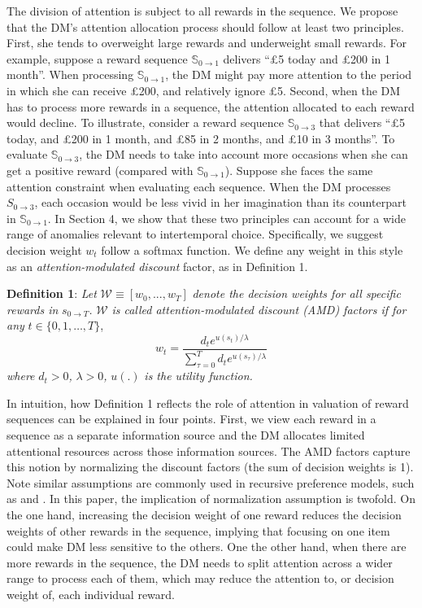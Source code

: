 \documentclass[
  12pt,
]{article}
\begin{document}
The division of attention is subject to all rewards in the sequence. We
propose that the DM's attention allocation process should follow at
least two principles. First, she tends to overweight large rewards and
underweight small rewards. For example, suppose a reward sequence
\(\mathbb{S}_{0\rightarrow1}\) delivers ``£5 today and £200 in 1
month''. When processing \(\mathbb{S}_{0\rightarrow1}\), the DM might
pay more attention to the period in which she can receive £200, and
relatively ignore £5. Second, when the DM has to process more rewards in
a sequence, the attention allocated to each reward would decline. To
illustrate, consider a reward sequence \(\mathbb{S}_{0\rightarrow 3}\)
that delivers ``£5 today, and £200 in 1 month, and £85 in 2 months, and
£10 in 3 months''. To evaluate \(\mathbb{S}_{0\rightarrow 3}\), the DM
needs to take into account more occasions when she can get a positive
reward (compared with \(\mathbb{S}_{0\rightarrow1}\)). Suppose she faces
the same attention constraint when evaluating each sequence. When the DM
processes \(S_{0\rightarrow 3}\), each occasion would be less vivid in
her imagination than its counterpart in \(\mathbb{S}_{0\rightarrow1}\).
In Section 4, we show that these two principles can account for a wide
range of anomalies relevant to intertemporal choice. Specifically, we
suggest decision weight \(w_t\) follow a softmax function. We define any
weight in this style as an \emph{attention-modulated discount} factor,
as in Definition 1.

\noindent \textbf{Definition 1}: \emph{Let}
\(\mathcal{W}\equiv[w_0,...,w_T]\) \emph{denote the decision weights for
all specific rewards in} \(s_{0\rightarrow T}\)\emph{.} \(\mathcal{W}\)
\emph{is called attention-modulated discount (AMD) factors if for any}
\(t\in\{0,1,…,T\}\),\[\tag{1}
w_t = \frac{d_te^{u(s_t)/\lambda}}{\sum_{\tau=0}^T d_te^{u(s_\tau)/\lambda}}
\]\emph{where} \(d_t > 0\)\emph{,} \(\lambda>0\)\emph{,} \(u(.)\)
\emph{is the utility function.}

In intuition, how Definition 1 reflects the role of attention in
valuation of reward sequences can be explained in four points. First, we
view each reward in a sequence as a separate information source and the
DM allocates limited attentional resources across those information
sources. The AMD factors capture this notion by normalizing the discount
factors (the sum of decision weights is 1). Note similar assumptions are
commonly used in recursive preference models, such as
\citet{weil1990nonexpected} and \citet{epstein1991substitution} . In
this paper, the implication of normalization assumption is twofold. On
the one hand, increasing the decision weight of one reward reduces the
decision weights of other rewards in the sequence, implying that
focusing on one item could make DM less sensitive to the others. One the
other hand, when there are more rewards in the sequence, the DM needs to
split attention across a wider range to process each of them, which may
reduce the attention to, or decision weight of, each individual reward.
\end{document}

